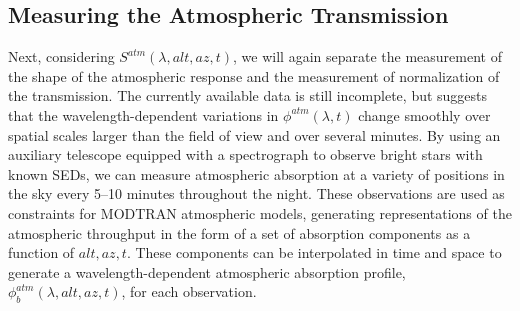 \documentclass[12pt,preprint]{aastex}
\begin{document}
\subsection{Measuring the Atmospheric Transmission}
Next, considering $S^{atm}(\lambda,alt,az,t)$, we will again separate
the measurement of the shape of the atmospheric response and the
measurement of normalization of the transmission.  The currently
available data is still incomplete, but suggests that the
wavelength-dependent variations in $\phi^{atm}(\lambda,t)$ change
smoothly over spatial scales larger than the field of view and over
several minutes.  By using an auxiliary telescope equipped with a
spectrograph to observe bright stars with known SEDs, we can measure
atmospheric absorption at a variety of positions in the sky every
5--10 minutes throughout the night. These observations are used as
constraints for MODTRAN atmospheric models, generating representations
of the atmospheric throughput in the form of a set of absorption
components as a function of $alt,az,t$. These components can be
interpolated in time and space to generate a wavelength-dependent
atmospheric absorption profile, $\phi_b^{atm}(\lambda,alt,az,t)$, for
each observation.

\begin{figure}[htbp]
\centering
{}
\end{figure}
 
\end{document}
